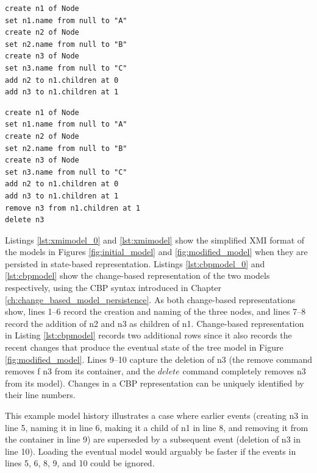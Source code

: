 \vspace{-20pt}
\begin{minipage}[t]{0.49\linewidth}
\begin{lstlisting}[style=eol,caption={Change-based representation of the tree model in Figure \ref{fig:initial_model}.},label=lst:cbpmodel_0]
create n1 of Node
set n1.name from null to "A"
create n2 of Node
set n2.name from null to "B"
create n3 of Node
set n3.name from null to "C"
add n2 to n1.children at 0
add n3 to n1.children at 1
\end{lstlisting}
\end{minipage}
\hfill
\begin{minipage}[t]{0.49\linewidth}
\begin{lstlisting}[style=eol,caption={Change-based representation of the tree model in Figure \ref{fig:modified_model}.},label=lst:cbpmodel]
create n1 of Node
set n1.name from null to "A"
create n2 of Node
set n2.name from null to "B"
create n3 of Node
set n3.name from null to "C"
add n2 to n1.children at 0
add n3 to n1.children at 1
remove n3 from n1.children at 1
delete n3
\end{lstlisting}
\end{minipage}

Listings \ref{lst:xmimodel_0} and \ref{lst:xmimodel} show the simplified XMI format of the models in Figures \ref{fig:initial_model} and \ref{fig:modified_model} when they are persisted in state-based representation. Listings \ref{lst:cbpmodel_0} and \ref{lst:cbpmodel} show the change-based representation of the two models respectively, using the CBP syntax introduced in Chapter \ref{ch:change_based_model_persistence}. As both change-based representations show, lines 1–6 record the creation and naming of the three nodes, and lines 7–8 record the addition of \textsf{n2} and \textsf{n3} as children of \textsf{n1}. Change-based representation in Listing \ref{lst:cbpmodel} records two additional rows since it also records the recent changes that produce the eventual state of the tree model in Figure \ref{fig:modified_model}. Lines 9–10 capture the deletion of \textsf{n3} (the \textsf{remove} command removes f \textsf{n3} from its container, and the $delete$ command completely removes \textsf{n3} from its model). Changes in a CBP representation can be uniquely identified by their line numbers.

This example model history illustrates a case where earlier events (creating \textsf{n3} in line 5, naming it in line 6, making it a child of \textsf{n1} in line 8, and removing it from the container in line 9) are superseded by a subsequent event (deletion of \textsf{n3} in line 10). Loading the eventual model would arguably be faster if the events in lines 5, 6, 8, 9, and 10 could be ignored.

